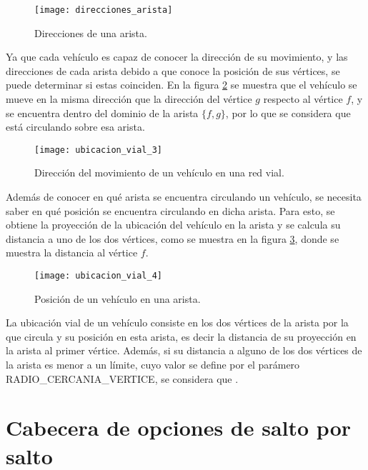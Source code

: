 \begin{figure}[th!]
\centering
\texttt{[image: direcciones\_arista]}
\decoRule
\caption[Direcciones de una arista]{Direcciones de una arista.}
\label{fig:direcciones_arista}
\end{figure}

Ya que cada vehículo es capaz de conocer la dirección de su movimiento, y las
direcciones de cada arista debido a que conoce la posición de sus vértices, se
puede determinar si estas coinciden. En la figura \ref{fig:ubicacion_vial_3} se
muestra que el vehículo se mueve en la misma dirección que la dirección del
vértice $g$ respecto al vértice $f$, y se encuentra dentro del dominio de la
arista $\{f,g\}$, por lo que se considera que está circulando sobre esa arista.

\begin{figure}[th!]
\centering
\texttt{[image: ubicacion\_vial\_3]} 
\decoRule
\caption[Dirección del movimiento de un vehículo en una red vial]{Dirección del
movimiento de un vehículo en una red vial.}
\label{fig:ubicacion_vial_3}
\end{figure}

Además de conocer en qué arista se encuentra circulando un vehículo, se
necesita saber en qué posición se encuentra circulando en dicha arista. Para
esto, se obtiene la proyección de la ubicación del vehículo en la arista y se
calcula su distancia a uno de los dos vértices, como se muestra en la figura
\ref{fig:ubicacion_vial_4}, donde se muestra la distancia al vértice $f$.

\begin{figure}[th!]
\centering
\texttt{[image: ubicacion\_vial\_4]} 
\decoRule
\caption[Posición de un vehículo en una red vial]{Posición de un vehículo en
una arista.}
\label{fig:ubicacion_vial_4}
\end{figure}

La ubicación vial de un vehículo consiste en los dos vértices de la arista
por la que circula y su posición en esta arista, es decir la distancia de su
proyección en la arista al primer vértice. Además, si su distancia a alguno de
los dos vértices de la arista es menor a un límite, cuyo valor se define por el
parámero RADIO\_CERCANIA\_VERTICE, se considera que .

\section{Cabecera de opciones de salto por salto}

